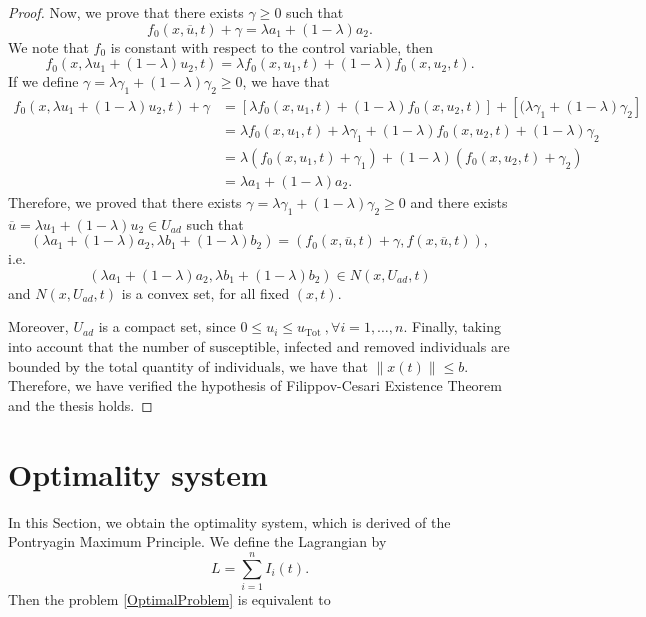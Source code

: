 \documentclass[a4paper,10pt]{article}
\theoremstyle{remark}
\begin{document}
\begin{proof}
Now, we prove that there exists $\gamma \geq 0$ such that
$$f_{0}\left(x, \overline{ u}, t\right)+\gamma=\lambda a_{1}+(1-\lambda) a_{2}.$$
We note that $f_0$ is constant with respect to the control variable, then
$$
f_{0}\left(x, \lambda  u_{1}+(1-\lambda)  u_{2}, t\right)=\lambda f_{0}\left(x,  u_{1}, t\right)+(1-\lambda) f_{0}\left(x,  u_{2}, t\right).
$$
If we define $\gamma=\lambda \gamma_{1}+(1-\lambda) \gamma_{2} \geq 0$, we have that
$$
\begin{aligned}
f_{0}\left(x,\lambda  u_{1}+(1-\lambda)  u_{2}, t\right)+\gamma &=\left[\lambda f_{0}\left(x, u_{1}, t\right)+(1-\lambda) f_{0}\left(x,  u_{2}, t\right)\right]+\left[(\lambda \gamma_{1}+(1-\lambda) \gamma_{2}\right] \\
&=\lambda f_{0}\left(x, u_{1}, t\right)+\lambda \gamma_{1}+(1-\lambda) f_{0}\left(x,  u_{2}, t\right)+(1-\lambda) \gamma_{2} \\
&=\lambda\left(f_{0}\left(x,  u_{1}, t\right)+\gamma_{1}\right)+(1-\lambda)\left(f_{0}\left(x,  u_{2}, t\right)+\gamma_{2}\right) \\
&=\lambda a_{1}+(1-\lambda) a_{2}.
\end{aligned}
$$
Therefore, we proved that there exists 
$\gamma=\lambda \gamma_{1}+(1-\lambda) \gamma_{2} \geq 0$ and there exists $\overline{ u}=\lambda  u_{1}+(1-\lambda)  u_{2} \in U_{ad}$
such that 
$$\left(\lambda {a_{1}}+(1-\lambda) {a_{2}}, \lambda b_{1}+(1-\lambda) b_{2}\right)=\left(f_{0}\left(x, \overline{ u}, t\right)+\gamma , f\left(x, \overline{ u}, t\right)\right),$$
i.e.
$$\left(\lambda a_{1}+(1-\lambda) a_{2}, \lambda b_{1}+(1-\lambda) b_{2}\right) \in N\left(x, U_{ad}, t\right)$$
and $N\left(x, U_{a d}, t\right)$ is a convex set, for all fixed $(x,t)$.

Moreover, $U_{ad}$ is a compact set, since $0 \leq  u_{i} \leq  u_{\text {Tot }}, \forall i=1, \ldots, n$. Finally, taking into account that the number of susceptible, infected and removed individuals are bounded by the total quantity of individuals, we have that $\|x(t)\| \leqslant b$. Therefore, we have verified the hypothesis of Filippov-Cesari Existence Theorem and the thesis holds.
\end{proof}

\section{Optimality system}

In this Section, we obtain the optimality system, which is derived of the Pontryagin Maximum Principle. We define the Lagrangian by
\[
L=\sum_{i=1}^{n} I_{i}(t).
\]
Then the problem \eqref{OptimalProblem} is equivalent to
\end{document}
